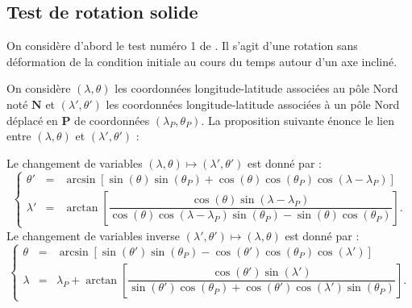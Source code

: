 \subsection{Test de rotation solide}

On considère d'abord le test numéro 1 de \cite{Williamson1992}. Il s'agit d'une rotation sans déformation de la condition initiale au cours du temps autour d'un axe incliné.

On considère $(\lambda, \theta)$ les coordonnées longitude-latitude associées au pôle Nord noté $\mathbf{N}$ et $(\lambda', \theta')$ les coordonnées longitude-latitude associées à un pôle Nord déplacé en $\mathbf{P}$ de coordonnées $(\lambda_P, \theta_P)$. La proposition suivante énonce le lien entre $(\lambda, \theta)$ et $(\lambda', \theta')$ :

\begin{proposition}
Le changement de variables $(\lambda, \theta) \mapsto (\lambda', \theta')$ est donné par :
\begin{equation}
\label{from classic to prime}
\left\lbrace 
\begin{array}{rcl}
\theta' & = & \arcsin \left[ \sin( \theta) \sin(\theta_P) + \cos( \theta ) \cos( \theta_P) \cos( \lambda - \lambda_P ) \right] \\
\lambda' & = & \arctan \left[ \dfrac{\cos ( \theta) \sin( \lambda - \lambda_P)}{\cos( \theta) \cos( \lambda - \lambda_P) \sin( \theta_P) - \sin( \theta) \cos( \theta_P)} \right].
\end{array}
\right.
\end{equation}
Le changement de variables inverse $(\lambda', \theta')\mapsto (\lambda, \theta)$ est donné par :
\begin{equation}
\label{from prime to classic}
\left\lbrace 
\begin{array}{rcl}
\theta & = & \arcsin \left[ \sin( \theta') \sin(\theta_P) - \cos( \theta' ) \cos( \theta_P) \cos( \lambda' ) \right] \\
\lambda & = & \lambda_P + \arctan \left[ \dfrac{\cos ( \theta') \sin( \lambda ')}{\sin( \theta') \cos( \theta_P) + \cos ( \theta') \cos( \lambda') \sin ( \theta_P)} \right].
\end{array}
\right.
\end{equation}
\end{proposition}

